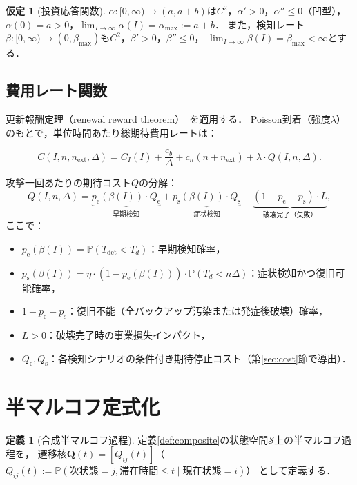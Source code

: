 \documentclass[12pt,a4paper]{article}
\theoremstyle{plain}
\theoremstyle{definition}
\newtheorem{definition}[theorem]{定義}
\newtheorem{assumption}[theorem]{仮定}
\theoremstyle{remark}
\newcommand{\Prob}{\mathbb{P}}
\newcommand{\pe}{p_{\mathrm{e}}}
\newcommand{\ps}{p_{\mathrm{s}}}
\newcommand{\Qe}{Q_{\mathrm{e}}}
\newcommand{\Qs}{Q_{\mathrm{s}}}
\newcommand{\betaI}{\beta(I)}
\begin{document}
\begin{assumption}[投資応答関数]\label{ass:alpha}
$\alpha:[0,\infty)\to(a,a+b)$は$C^2$，$\alpha'>0$，$\alpha''\le0$（凹型），
$\alpha(0)=a>0$，$\lim_{I\to\infty}\alpha(I)=\alpha_{\max}:=a+b$．
また，検知レート$\beta:[0,\infty)\to(0,\beta_{\max})$も$C^2$，$\beta'>0$，$\beta''\le0$，
$\lim_{I\to\infty}\beta(I)=\beta_{\max}<\infty$とする．
\end{assumption}

\subsection{費用レート関数}

更新報酬定理（renewal reward theorem）~\cite{ross2014}を適用する．
Poisson到着（強度$\lambda$）のもとで，単位時間あたり総期待費用レートは：

\begin{equation}\label{eq:cost_rate}
  C(I,n,n_{\mathrm{ext}},\Delta)
  = C_I(I) + \frac{c_b}{\Delta} + c_n(n+n_{\mathrm{ext}})
  + \lambda\cdot Q(I,n,\Delta).
\end{equation}

攻撃一回あたりの期待コスト$Q$の分解：
\begin{equation}\label{eq:Q_decomp}
  Q(I,n,\Delta)
  = \underbrace{\pe(\betaI)\cdot\Qe}_{\text{早期検知}}
  + \underbrace{\ps(\betaI)\cdot\Qs}_{\text{症状検知}}
  + \underbrace{(1-\pe-\ps)\cdot L}_{\text{破壊完了（失敗）}},
\end{equation}
ここで：
\begin{itemize}
\item $\pe(\betaI)=\Prob(T_{\mathrm{det}}<T_d)$：早期検知確率，
\item $\ps(\betaI)=\eta\cdot(1-\pe(\betaI))\cdot\Prob(T_d<n\Delta)$：症状検知かつ復旧可能確率，
\item $1-\pe-\ps$：復旧不能（全バックアップ汚染または発症後破壊）確率，
\item $L>0$：破壊完了時の事業損失インパクト，
\item $\Qe,\Qs$：各検知シナリオの条件付き期待停止コスト（第\ref{sec:cost}節で導出）．
\end{itemize}

\section{半マルコフ定式化}
\label{sec:smkov}

\begin{definition}[合成半マルコフ過程]\label{def:smp}
定義\ref{def:composite}の状態空間$\mathcal S$上の半マルコフ過程を，
遷移核$\mathbf Q(t)=[Q_{ij}(t)]$（$Q_{ij}(t):=\Prob(\text{次状態}=j,\text{滞在時間}\le t\mid\text{現在状態}=i)$）
として定義する．
\end{definition}
\end{document}
